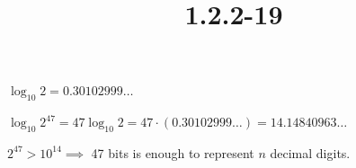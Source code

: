 \documentclass{article}
\title{1.2.2-19}
\begin{document}
\maketitle

$\log_{10}{2} = 0.30102999\ldots$

$\log_{10}{2^{47}} = 47 \log_{10}{2} = 47 \cdot (0.30102999\ldots) = 14.14840963\ldots$

$2^{47} > 10^{14} \implies$ 47 bits is enough to represent $n$ decimal digits.
\end{document}
